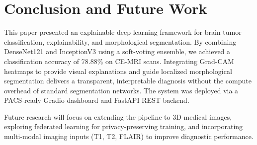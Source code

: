 \documentclass[journal,twoside]{IEEEtran}
\begin{document}
\section{Conclusion and Future Work}
This paper presented an explainable deep learning framework for brain tumor classification, explainability, and morphological segmentation. By combining DenseNet121 and InceptionV3 using a soft-voting ensemble, we achieved a classification accuracy of $78.88\%$ on CE-MRI scans. Integrating Grad-CAM heatmaps to provide visual explanations and guide localized morphological segmentation delivers a transparent, interpretable diagnosis without the compute overhead of standard segmentation networks. The system was deployed via a PACS-ready Gradio dashboard and FastAPI REST backend. 

Future research will focus on extending the pipeline to 3D medical images, exploring federated learning for privacy-preserving training, and incorporating multi-modal imaging inputs (T1, T2, FLAIR) to improve diagnostic performance.
\end{document}

